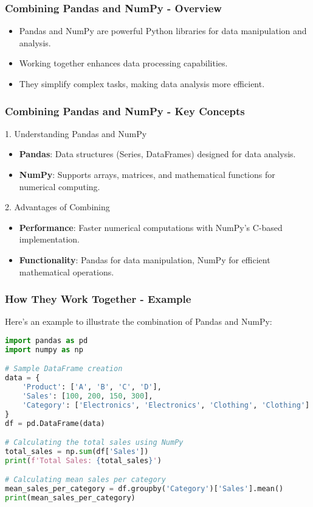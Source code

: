 \documentclass[aspectratio=169]{beamer}
\begin{document}
\begin{frame}[fragile]
    \frametitle{Combining Pandas and NumPy - Overview}
    \begin{itemize}
        \item Pandas and NumPy are powerful Python libraries for data manipulation and analysis.
        \item Working together enhances data processing capabilities.
        \item They simplify complex tasks, making data analysis more efficient.
    \end{itemize}
\end{frame}

\begin{frame}[fragile]
    \frametitle{Combining Pandas and NumPy - Key Concepts}
    \begin{block}{1. Understanding Pandas and NumPy}
        \begin{itemize}
            \item \textbf{Pandas}: Data structures (Series, DataFrames) designed for data analysis.
            \item \textbf{NumPy}: Supports arrays, matrices, and mathematical functions for numerical computing.
        \end{itemize}
    \end{block}
    
    \begin{block}{2. Advantages of Combining}
        \begin{itemize}
            \item \textbf{Performance}: Faster numerical computations with NumPy's C-based implementation.
            \item \textbf{Functionality}: Pandas for data manipulation, NumPy for efficient mathematical operations.
        \end{itemize}
    \end{block}
\end{frame}

\begin{frame}[fragile]
    \frametitle{How They Work Together - Example}
    Here’s an example to illustrate the combination of Pandas and NumPy:

    \begin{lstlisting}[language=Python]
import pandas as pd
import numpy as np

# Sample DataFrame creation
data = {
    'Product': ['A', 'B', 'C', 'D'],
    'Sales': [100, 200, 150, 300],
    'Category': ['Electronics', 'Electronics', 'Clothing', 'Clothing']
}
df = pd.DataFrame(data)

# Calculating the total sales using NumPy
total_sales = np.sum(df['Sales'])
print(f'Total Sales: {total_sales}')

# Calculating mean sales per category
mean_sales_per_category = df.groupby('Category')['Sales'].mean()
print(mean_sales_per_category)
    \end{lstlisting}
\end{frame}
\end{document}

